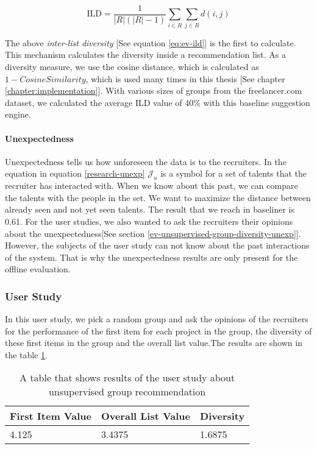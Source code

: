 \begin{equation}
\mathrm { ILD } = \frac { 1 } { | R | ( | R | - 1 ) } \sum _ { i \in R } \sum _ { j \in R } d ( i , j )
\label{eq:ev-ild}
\end{equation}

The above \textit{inter-list diversity} [See equation \eqref{eq:ev-ild}] is the first to calculate. This mechanism calculates the diversity inside a recommendation list. As a diversity measure, we use the cosine distance, which is calculated as $1 - Cosine Similarity$, which is used many times in this thesis [See chapter \ref{chapter:implementation}]. With various sizes of groups from the freelancer.com dataset, we calculated the average ILD value of 40\% with this baseline suggestion engine.

\paragraph{Unexpectedness}\label{ev-unsupervised-group-unexpectedness}

Unexpectedness tells us how unforeseen the data is to the recruiters.  In the equation in equation \eqref{research-unexp} $\mathcal { J } _ { u }$ is a symbol for a set of talents that the recruiter has interacted with. When we know about this past, we can compare the talents with the people in the set. We want to maximize the distance between already seen and not yet seen talents. The result that we reach in baseliner is 0.61. For the user studies, we also wanted to ask the recruiters their opinions about the unexpectedness[See section \ref{ev-unsupervised-group-diversity-unexp}]. However, the subjects of the user study can not know about the past interactions of the system. That is why the unexpectedness results are only present for the offline evaluation. 

\subsubsection{User Study}\label{subsubsection:user-study-first-group}

In this user study, we pick a random group and ask the opinions of the recruiters for the performance of the first item for each project in the group, the diversity of these first items in the group and the overall list value.The results are shown in the table \ref{tab:user-study-group-rec-unsupervised}.

\begin{table}[ht]
	\caption[User Study Group Unsupervised]{A table that shows results of the user study about unsupervised group recommendation}\label{tab:user-study-group-rec-unsupervised}
	\centering
	\begin{tabular}{l l l}
		\toprule
		First Item Value & Overall List Value & Diversity \\
		\midrule
		4.125 & 3.4375&  1.6875\\
		\bottomrule
	\end{tabular}
\end{table}

